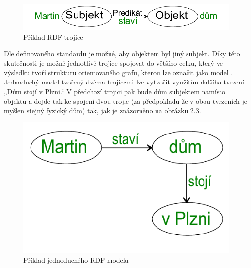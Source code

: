 \documentclass{projekt}
\begin{document}
\begin{figure}[htb]
\begin{center}
\includegraphics[scale=0.9]{trojice.pdf}
\caption{Příklad RDF trojice}
\end{center}
\end{figure}

Dle definovaného standardu \cite{_5} je možné, aby objektem byl jiný subjekt. Díky této skutečnosti je možné jednotlivé trojice spojovat do většího celku, který ve výsledku tvoří strukturu orientovaného grafu, kterou lze označit jako model \cite{_3}. Jednoduchý model tvořený dvěma trojicemi lze vytvořit využitím dalšího tvrzení „Dům stojí v Plzni.“ V předchozí trojici pak bude dům subjektem namísto objektu a dojde tak ke spojení dvou trojic (za předpokladu že v obou tvrzeních je myšlen stejný fyzický dům) tak, jak je znázorněno na obrázku 2.3. 

\begin{figure}[htb]
\begin{center}
\includegraphics[scale=0.9]{miniStrom.pdf}
\caption{Příklad jednoduchého RDF modelu}
\end{center}
\end{figure}
\end{document}
